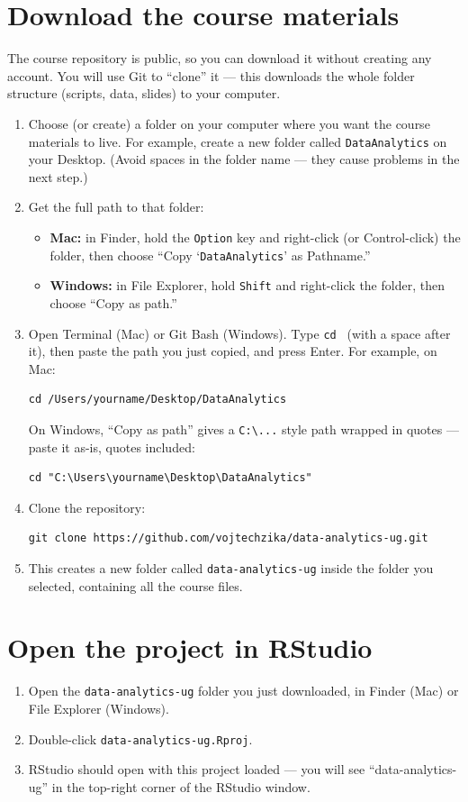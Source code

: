 \documentclass[11pt]{article}
\begin{document}
\section{Download the course materials}
The course repository is public, so you can download it without creating any account. You will use Git to ``clone'' it --- this downloads the whole folder structure (scripts, data, slides) to your computer.
\begin{enumerate}
	\item Choose (or create) a folder on your computer where you want the course materials to live. For example, create a new folder called \texttt{DataAnalytics} on your Desktop. (Avoid spaces in the folder name --- they cause problems in the next step.)
	\item Get the full path to that folder:
	\begin{itemize}
		\item \textbf{Mac:} in Finder, hold the \texttt{Option} key and right-click (or Control-click) the folder, then choose ``Copy `\texttt{DataAnalytics}' as Pathname.''
		\item \textbf{Windows:} in File Explorer, hold \texttt{Shift} and right-click the folder, then choose ``Copy as path.''
	\end{itemize}
	\item Open Terminal (Mac) or Git Bash (Windows). Type \texttt{cd } (with a space after it), then paste the path you just copied, and press Enter. For example, on Mac:
\begin{lstlisting}
cd /Users/yourname/Desktop/DataAnalytics
\end{lstlisting}
	On Windows, ``Copy as path'' gives a \texttt{C:\textbackslash{}...} style path wrapped in quotes --- paste it as-is, quotes included:
\begin{lstlisting}
cd "C:\Users\yourname\Desktop\DataAnalytics"
\end{lstlisting}
	\item Clone the repository:
\begin{lstlisting}
git clone https://github.com/vojtechzika/data-analytics-ug.git
\end{lstlisting}
	\item This creates a new folder called \texttt{data-analytics-ug} inside the folder you selected, containing all the course files.
\end{enumerate}

	\section{Open the project in RStudio}
	\begin{enumerate}
		\item Open the \texttt{data-analytics-ug} folder you just downloaded, in Finder (Mac) or File Explorer (Windows).
		\item Double-click \texttt{data-analytics-ug.Rproj}.
		\item RStudio should open with this project loaded --- you will see ``data-analytics-ug'' in the top-right corner of the RStudio window.
	\end{enumerate}
\end{document}
